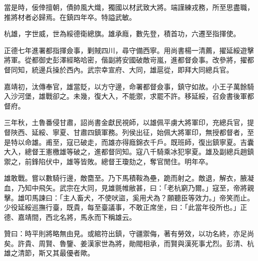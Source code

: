 \begin{pinyinscope}
當是時，佞倖擅朝，債帥風大熾，獨國以材武致大將。端謹練戎務，所至思盡職，推將材者必歸焉。在鎮四年卒。特謚武敏。

杭雄，字世威，世為綏德衛總旗。雄承廕，數先登，積首功，六遷至指揮使。

正德七年進署都指揮僉事，剿賊四川，尋守備西寧。用尚書楊一清薦，擢延綏遊擊將軍。從都御史彭澤經略哈密，偕副將安國破敵岢嵐，進都督僉事。改參將，擢都督同知，統邊兵操於西內。武宗幸宣府、大同，雄扈從，即拜大同總兵官。

嘉靖初，汰傳奉官，雄當貶，以方守邊，命署都督僉事，鎮守如故。小王子萬餘騎入沙河堡，雄戰卻之。未幾，復大入，不能禦，求罷不許。移延綏，召僉書後軍都督府。

三年秋，土魯番侵甘肅，詔尚書金獻民視師，以雄佩平虜大將軍印，充總兵官，提督陜西、延綏、寧夏、甘肅四鎮軍務。列侯出征，始佩大將軍印，無授都督者，至是特以命雄。甫至，寇已破走，而雄亦得廕錦衣千戶。既班師，復出鎮寧夏。吉囊大入，總督王憲檄雄等破之，進都督同知。寇八千騎乘冰犯寧夏。雄及副總兵趙鎮禦之，前鋒陷伏中，雄等皆敗。總督王瓊劾之，奪官閒住。明年卒。

雄敢戰。嘗以數騎行邊，敵麕至。乃下馬積鞍為壘，跪而射之。敵退，解衣，腋凝血，乃知中飛矢。武宗在大同，見雄氈帷敝甚，曰：「老杭窮乃爾。」寇至，帝將親擊。雄叩馬諫曰：「主人畜犬，不使吠盜，奚用犬為？願聽臣等效力。」帝笑而止。少役延綏巡撫行臺，既貴，每至臺議事，不敢正席坐，曰：「此當年役所也。」正德、嘉靖間，西北名將，馬永而下稱雄云。

贊曰：時平則將略無由見。或綰符出鎮，守疆禦侮，著有勞效，以功名終，亦足尚矣。許貴、周賢、魯鑒、姜漢家世為將，勛閥相承，而賢與漢死事尤烈。彭清、杭雄之清節，斯又其最優者歟。


\end{pinyinscope}